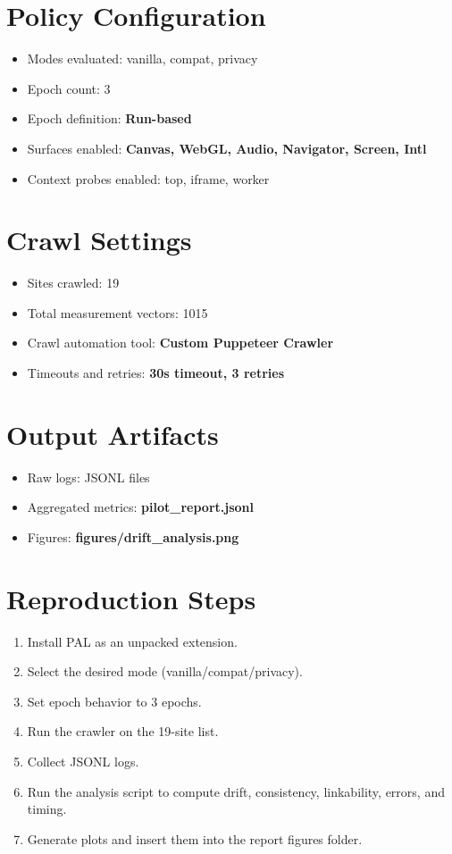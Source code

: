 \documentclass[11pt]{report}
\begin{document}
\section{Policy Configuration}

\begin{itemize}
    \item Modes evaluated: vanilla, compat, privacy
    \item Epoch count: 3
    \item Epoch definition: \textbf{Run-based}
    \item Surfaces enabled: \textbf{Canvas, WebGL, Audio, Navigator, Screen, Intl}
    \item Context probes enabled: top, iframe, worker
\end{itemize}

\section{Crawl Settings}

\begin{itemize}
    \item Sites crawled: 19
    \item Total measurement vectors: 1015
    \item Crawl automation tool: \textbf{Custom Puppeteer Crawler}
    \item Timeouts and retries: \textbf{30s timeout, 3 retries}
\end{itemize}

\section{Output Artifacts}

\begin{itemize}
    \item Raw logs: JSONL files
    \item Aggregated metrics: \textbf{pilot_report.jsonl}
    \item Figures: \textbf{figures/drift_analysis.png}
\end{itemize}

\section{Reproduction Steps}

\begin{enumerate}
    \item Install PAL as an unpacked extension.
    \item Select the desired mode (vanilla/compat/privacy).
    \item Set epoch behavior to 3 epochs.
    \item Run the crawler on the 19-site list.
    \item Collect JSONL logs.
    \item Run the analysis script to compute drift, consistency, linkability, errors, and timing.
    \item Generate plots and insert them into the report figures folder.
\end{enumerate}
\end{document}
